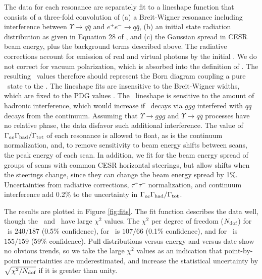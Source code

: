 \documentclass[aps,prl,superscriptaddress,showpacs,floatfix]{revtex4}
\begin{document}
The data for each resonance are separately fit to a lineshape function
that consists of a three-fold convolution of (a) a Breit-Wigner
resonance including interference between $\Upsilon \to q\bar{q}$ and
$e^+e^- \to q\bar{q}$, (b) an initial state radiation distribution as
given in Equation 28 of \cite{kf}, and (c) the Gaussian spread in CESR
beam energy, plus the background terms described above.  The radiative
corrections account for emission of real and virtual photons by the
initial \ee.  We do not correct for vacuum polarization, which is
absorbed into the definition of \gee.  The resulting \gee\ values
therefore should represent the Born diagram coupling a pure \ee\ state
to the \ups.  The lineshape fits are insensitive to the Breit-Wigner
widths, which are fixed to the PDG values \cite{pdg}.  The \us\
lineshape is sensitive to the amount of hadronic interference, which
would increase if \ups\ decays via $ggg$ interfered with $q\bar{q}$
decays from the continuum.  Assuming that $\Upsilon \to ggg$ and
$\Upsilon \to q\bar{q}$ processes have no relative phase, the data
disfavor such additional interference.  The value of $\Gamma_{ee}\Gamma_{\mbox{\scriptsize had}}/\Gamma_{\mbox{\scriptsize tot}}$ of
each resonance is allowed to float, as is the continuum normalization,
and, to remove sensitivity to beam energy shifts between scans, the
peak energy of each scan.  In addition, we fit for the beam energy
spread of groups of scans with common CESR horizontal steerings, but
allow shifts when the steerings change, since they can change the beam
energy spread by 1\%.  Uncertainties from radiative corrections,
$\tau^+\tau^-$ normalization, and continuum interference add 0.2\% to
the uncertainty in $\Gamma_{ee}\Gamma_{\mbox{\scriptsize had}}/\Gamma_{\mbox{\scriptsize tot}}$.

The results are plotted in Figure \ref{fig:fits}.  The fit function
describes the data well, though the \us\ and \uss\ have large $\chi^2$
values.  The $\chi^2$ per degree of freedom ($N_{\mbox{\scriptsize
dof}}$) for \us\ is $240/187$ (0.5\% confidence), for \uss\ is
$107/66$ (0.1\% confidence), and for \usss\ is $155/159$ (59\%
confidence).  Pull distributions versus energy and versus date show no
obvious trends, so we take the large $\chi^2$ values as an indication
that point-by-point uncertainties are underestimated, and increase the
statistical uncertainty by $\sqrt{\chi^2/N_{\mbox{\scriptsize dof}}}$
if it is greater than unity.
\end{document}
